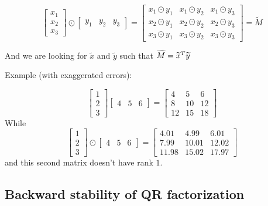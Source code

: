 \documentclass[ComputationalMathematics.tex]{subfiles}
\begin{document}
\[
\begin{bmatrix}
    x_1\\ x_2\\ x_3
\end{bmatrix} \odot
\begin{bmatrix}
    y_1 & y_2 & y_3
\end{bmatrix}
=
\begin{bmatrix}
    x_1 \odot y_1 & x_1  \odot y_2 & x_1  \odot y_3\\
    x_2  \odot y_1 & x_2  \odot y_2 & x_2  \odot y_3\\
    x_3  \odot y_1 & x_3  \odot y_2 & x_3  \odot y_3
\end{bmatrix}
=
\widetilde{M}
\]

And we are looking for $\widetilde{x}$ and $\widetilde{y}$ such that $\widetilde{M} = {\widetilde{x}}^{T} \widetilde{y}$
\begin{example}
Example (with exaggerated errors):

\[
\begin{bmatrix}
    1\\2\\3
\end{bmatrix}
\begin{bmatrix}
    4&5&6
\end{bmatrix}
=
\begin{bmatrix}
    4 & 5 & 6\\
    8 & 10 & 12\\
    12 & 15 & 18
\end{bmatrix}
\]
While
  \[
\begin{bmatrix}
    1\\2\\3
\end{bmatrix} \odot
\begin{bmatrix}
    4&5&6
\end{bmatrix}
=
\begin{bmatrix}
    4.01 & 4.99 & 6.01\\
    7.99 & 10.01 & 12.02\\
    11.98 & 15.02 & 17.97
\end{bmatrix}
\]
and this second matrix doesn't have rank $1$.
\end{example}

\subsection{Backward stability of QR factorization}
\end{document}
